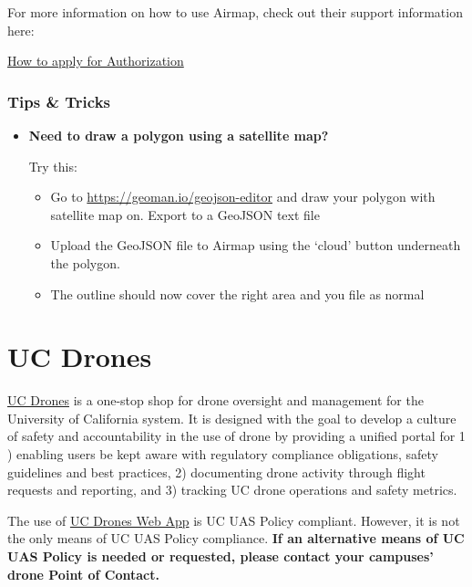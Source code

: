 \documentclass[
  12pt,
]{book}
\providecommand{\tightlist}{%
  \setlength{\itemsep}{0pt}\setlength{\parskip}{0pt}}
\begin{document}
For more information on how to use Airmap, check out their support information here:

\href{https://support.airmap.com/hc/en-us/articles/360030924511-How-to-apply-for-Authorization}{How to apply for Authorization}

\hypertarget{tips-tricks}{%
\subsection{Tips \& Tricks}\label{tips-tricks}}

\begin{itemize}
\item
  \textbf{Need to draw a polygon using a satellite map?}

  Try this:

  \begin{itemize}
  \tightlist
  \item
    Go to \url{https://geoman.io/geojson-editor} and draw your polygon with satellite map on. Export to a GeoJSON text file
  \item
    Upload the GeoJSON file to Airmap using the `cloud' button underneath the polygon.
  \item
    The outline should now cover the right area and you file as normal
  \end{itemize}
\end{itemize}

\hypertarget{UCdrones}{%
\chapter{UC Drones}\label{UCdrones}}

\href{http://ehs.ucop.edu/drones}{UC Drones} is a one-stop shop for drone oversight and management for the University of California system. It is designed with the goal to develop a culture of safety and accountability in the use of drone by providing a unified portal for 1 ) enabling users be kept aware with regulatory compliance obligations, safety guidelines and best practices, 2) documenting drone activity through flight requests and reporting, and 3) tracking UC drone operations and safety metrics.

The use of \href{http://ehs.ucop.edu/drones}{UC Drones Web App} is UC UAS Policy compliant. However, it is not the only means of UC UAS Policy compliance. \textbf{If an alternative means of UC UAS Policy is needed or requested, please contact your campuses' drone Point of Contact.}
\end{document}
